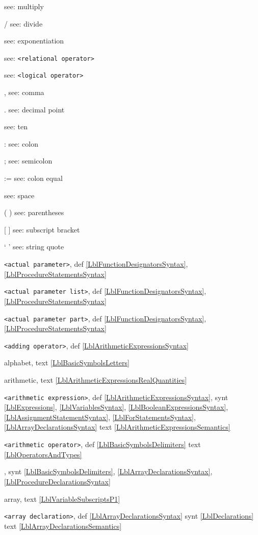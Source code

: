 \documentclass[a4paper,11pt]{article}
\begin{document}
\mtim{} see: multiply

/ \mdiv{} see: divide

\mpow{} see: exponentiation

\mlt{} \mle{} \meq{} \mge{} \mgt{} \mne{} see: \texttt{<relational operator>}

\mleqv{} \mlimp{} \mlor{} \mland{} \mlnot{} see: \texttt{<logical operator>}

, see: comma

. see: decimal point

\ten{} see: ten

: see: colon

; see: semicolon

:= see: colon equal

\blankchar{} see: space

( ) see: parentheses

[ ] see: subscript bracket

` ' see: string quote


\texttt{<actual parameter>},
def
\ref{LblFunctionDesignatorsSyntax},
\ref{LblProcedureStatementsSyntax}\*

\texttt{<actual parameter list>},
def
\ref{LblFunctionDesignatorsSyntax},
\ref{LblProcedureStatementsSyntax}\*

\texttt{<actual parameter part>},
def
\ref{LblFunctionDesignatorsSyntax},
\ref{LblProcedureStatementsSyntax}\*

\texttt{<adding operator>},
def
\ref{LblArithmeticExpressionsSyntax}\*

alphabet,
text
\ref{LblBasicSymbolsLetters}\*

arithmetic,
text
\ref{LblArithmeticExpressionsRealQuantities}\*

\texttt{<arithmetic expression>},
def
\ref{LblArithmeticExpressionsSyntax},
synt
\ref{LblExpressions},
\ref{LblVariablesSyntax},
\ref{LblBooleanExpressionsSyntax},
\ref{LblAssignmentStatementSyntax},
\ref{LblForStatementsSyntax},
\ref{LblArrayDeclarationsSyntax}
text
\ref{LblArithmeticExpressionsSemantics}\*

\texttt{<arithmetic operator>},
def
\ref{LblBasicSymbolsDelimiters}
text
\ref{LblOperatorsAndTypes}\*

,
synt
\ref{LblBasicSymbolsDelimiters},
\ref{LblArrayDeclarationsSyntax},
\ref{LblProcedureDeclarationsSyntax}\*

array,
text
\ref{LblVariableSubscriptsP1}\*

\texttt{<array declaration>},
def
\ref{LblArrayDeclarationsSyntax}
synt
\ref{LblDeclarations}
text
\ref{LblArrayDeclarationsSemantics}\*
\end{document}

